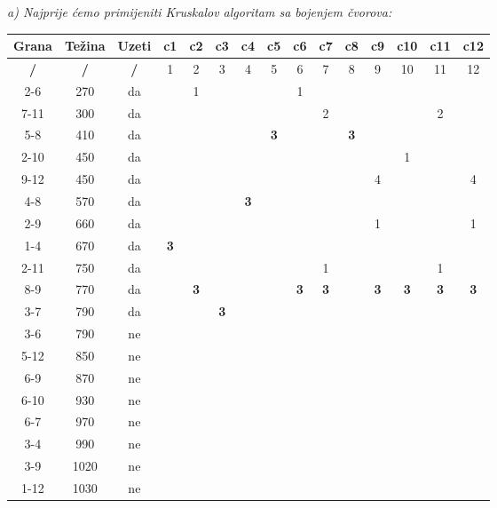 \documentclass[12pt]{article}
\begin{document}
\begin{enumerate}
\begin{center}
    \textit{a) Najprije ćemo primijeniti Kruskalov algoritam sa bojenjem čvorova:\\}

\begin{tabular}{|c|c|c|c|c|c|c|c|c|c|c|c|c|c|c|}
\hline
Grana & Težina & Uzeti & c1 & c2 & c3 & c4 & c5 & c6 & c7 & c8 & c9 & c10 & c11 & c12 \\ \hline
\textbf{/} & \textbf{/} & \textbf{/} & 1 & 2 & 3 & 4 & 5 & 6 & 7 & 8 & 9 & 10 & 11 & 12 \\ \hline
2-6 & 270 & da &  & 1 &  &  &  & 1 &  &  &  &  &  &  \\ \hline
7-11 & 300 & da &  &  &  &  &  &  & 2 &  &  &  & 2 &  \\ \hline
5-8 & 410 & da &  &  &  &  & \textbf{3} &  &  & \textbf{3} &  &  &  &  \\ \hline
2-10 & 450 & da &  &  &  &  &  &  &  &  &  & 1 &  &  \\ \hline
9-12 & 450 & da &  &  &  &  &  &  &  &  & 4 &  &  & 4 \\ \hline
4-8 & 570 & da &  &  &  & \textbf{3} &  &  &  &  &  &  &  &  \\ \hline
2-9 & 660 & da &  &  &  &  &  &  &  &  & 1 &  &  & 1 \\ \hline
1-4 & 670 & da & \textbf{3} &  &  &  &  &  &  &  &  &  &  &  \\ \hline
2-11 & 750 & da &  &  &  &  &  &  & 1 &  &  &  & 1 &  \\ \hline
8-9 & 770 & da &  & \textbf{3} &  &  &  & \textbf{3} & \textbf{3} &  & \textbf{3} & \textbf{3} & \textbf{3} & \textbf{3} \\ \hline
3-7 & 790 & da &  &  & \textbf{3} &  &  &  &  &  &  &  &  &  \\ \hline
3-6 & 790 & ne &  &  &  &  &  &  &  &  &  &  &  &  \\ \hline
5-12 & 850 & ne &  &  &  &  &  &  &  &  &  &  &  &  \\ \hline
6-9 & 870 & ne &  &  &  &  &  &  &  &  &  &  &  &  \\ \hline
6-10 & 930 & ne &  &  &  &  &  &  &  &  &  &  &  &  \\ \hline
6-7 & 970 & ne &  &  &  &  &  &  &  &  &  &  &  &  \\ \hline
3-4 & 990 & ne &  &  &  &  &  &  &  &  &  &  &  &  \\ \hline
3-9 & 1020 & ne &  &  &  &  &  &  &  &  &  &  &  &  \\ \hline
1-12 & 1030 & ne &  &  &  &  &  &  &  &  &  &  &  &  \\ \hline

\end{tabular}
\end{center}
\end{enumerate}
\end{document}
